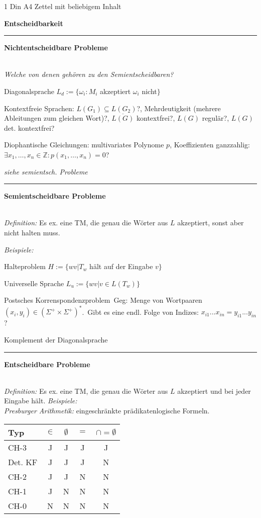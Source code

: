\documentclass{article}
\newcommand{\h}[1]{\vspace{1ex}\begin{center}\small\textbf{#1}\end{center}}
\newcommand{\hh}[1]{{\vspace{1pt}\hrule\vspace{1pt} \noindent\textbf{#1}}\\}
\newcommand{\hhh}[1]{{\vspace{1pt}\noindent\emph{#1:}}}
\newenvironment{tightlist}{
\begin{list}{\textbullet}{
\setlength{\topsep}{-1ex}
\setlength{\itemsep}{-1ex}
\setlength{\leftmargin}{4ex}
}
}{
\end{list}
\vspace{1ex}
}
\newcommand{\FM}[1]{{\color{red}\emph{#1}}}
\begin{document}
\begin{center} 1 Din A4 Zettel mit beliebigem Inhalt\end{center}

\begin{multicols}{4}
\scriptsize\raggedright

\setlength{\parskip}{0pt}

\h{Entscheidbarkeit}
\hh{Nichtentscheidbare Probleme}
\FM{Welche von denen gehören zu den Semientscheidbaren?}
\begin{tightlist}
\item Diagonalsprache
	$L_d:=\{\omega_i: M_i$ akzeptiert $\omega_i$ nicht$\}$
\item Kontextfreie Sprachen:
$L(G_1) \subseteq L(G_2)$?,
Mehrdeutigkeit (mehrere Ableitungen zum gleichen Wort)?,
$\overline{L(G)}$ kontextfrei?,
$L(G)$ regulär?,
$L(G)$ det. kontextfrei?
\item Diophantische Gleichungen: multivariates Polynome $p$, Koeffizienten ganzzahlig: $\exists x_1, \ldots, x_n\in\mathbb{Z}:p(x_1, \ldots, x_n)=0$?
\item \emph{siehe semientsch. Probleme}
\end{tightlist}


\hh{Semientscheidbare Probleme}
\hhh{Definition} Es ex. eine TM, die genau die Wörter aus $L$ akzeptiert, sonst aber nicht halten muss.

\hhh{Beispiele}
\begin{tightlist}
\item Halteproblem 
	$H:=\{wv | T_w$ hält auf der Eingabe $v\}$
\item Universelle Sprache
	$L_u:=\{wv| v\in L(T_w)\}$
\item Postsches Korrenspondenzproblem\ Geg: Menge von Wortpaaren $(x_i , y_i) \in (\Sigma^+ \times \Sigma^+)^*$.\ Gibt es eine endl. Folge von Indizes: $x_{i1} ... x_{in}=y_{i1}... y_{in}$?
\item Komplement der Diagonalsprache
\end{tightlist}


\hh{Entscheidbare Probleme}
\hhh{Definition} Es ex. eine TM, die genau die Wörter aus $L$ akzeptiert und bei jeder Eingabe hält.
\hhh{Beispiele}\\
\hhh{Presburger Arithmetik} eingeschränkte prädikatenlogische Formeln.\\
\begin{tabular}{l|c|c|c|c}
Typ & $\in$ & $\emptyset$ & $=$ &$\cap=\emptyset$ \\
\hline
CH-3 & J & J & J & J \\
Det. KF & J & J & J & N \\
CH-2& J & J & N & N \\
CH-1& J & N & N & N \\
CH-0& N & N & N & N  
\end{tabular}



\end{multicols}
\end{document}
